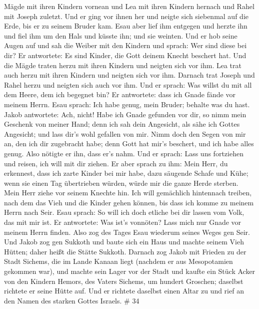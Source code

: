 Mägde mit ihren Kindern vornean und Lea mit ihren Kindern hernach und
Rahel mit Joseph zuletzt.  Und er ging vor ihnen her und
neigte sich siebenmal auf die Erde, bis er zu seinem Bruder kam.
 Esau aber lief ihm entgegen und herzte ihn und fiel ihm um
den Hals und küsste ihn; und sie weinten.  Und er hob seine
Augen auf und sah die Weiber mit den Kindern und sprach: Wer sind diese
bei dir? Er antwortete: Es sind Kinder, die Gott deinem Knecht beschert
hat.  Und die Mägde traten herzu mit ihren Kindern und
neigten sich vor ihm.  Lea trat auch herzu mit ihren Kindern
und neigten sich vor ihm. Darnach trat Joseph und Rahel herzu und
neigten sich auch vor ihm.  Und er sprach: Was willst du mit
all dem Heere, dem ich begegnet bin? Er antwortete: dass ich Gnade fände
vor meinem Herrn.  Esau sprach: Ich habe genug, mein Bruder;
behalte was du hast.  Jakob antwortete: Ach, nicht! Habe
ich Gnade gefunden vor dir, so nimm mein Geschenk von meiner Hand; denn
ich sah dein Angesicht, als sähe ich Gottes Angesicht; und lass dir's
wohl gefallen von mir.  Nimm doch den Segen von mir an, den
ich dir zugebracht habe; denn Gott hat mir's beschert, und ich habe
alles genug. Also nötigte er ihn, dass er's nahm.  Und er
sprach: Lass uns fortziehen und reisen, ich will mit dir ziehen.
 Er aber sprach zu ihm: Mein Herr, du erkennest, dass ich
zarte Kinder bei mir habe, dazu säugende Schafe und Kühe; wenn sie einen
Tag übertrieben würden, würde mir die ganze Herde sterben. 
Mein Herr ziehe vor seinem Knechte hin. Ich will gemächlich hintennach
treiben, nach dem das Vieh und die Kinder gehen können, bis dass ich
komme zu meinem Herrn nach Seir.  Esau sprach: So will ich
doch etliche bei dir lassen vom Volk, das mit mir ist. Er antwortete:
Was ist's vonnöten? Lass mich nur Gnade vor meinem Herrn finden.
 Also zog des Tages Esau wiederum seines Weges gen Seir.
 Und Jakob zog gen Sukkoth und baute sich ein Haus und
machte seinem Vieh Hütten; daher heißt die Stätte Sukkoth. 
Darnach zog Jakob mit Frieden zu der Stadt Sichems, die im Lande Kanaan
liegt (nachdem er aus Mesopotamien gekommen war), und machte sein Lager
vor der Stadt  und kaufte ein Stück Acker von den Kindern
Hemors, des Vaters Sichems, um hundert Groschen; daselbst richtete er
seine Hütte auf.  Und er richtete daselbst einen Altar zu
und rief an den Namen des starken Gottes Israels. \# 34 
